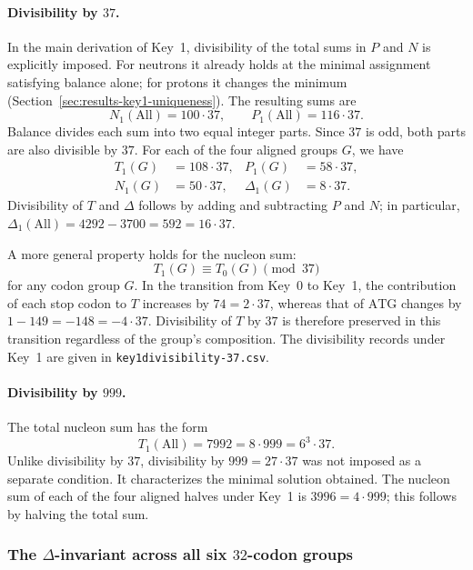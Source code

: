 \documentclass[11pt,a4paper]{article}
\renewcommand{\_}{\origunderscore\allowbreak}
\begin{document}
\paragraph{Divisibility by $37$.}
In the main derivation of Key~1, divisibility of the
total sums in $P$ and $N$ is explicitly imposed. For
neutrons it already holds at the minimal assignment
satisfying balance alone; for protons it changes the
minimum (Section~\ref{sec:results-key1-uniqueness}).
The resulting sums are
\[
N_1(\mathrm{All})=100\cdot37,\qquad
P_1(\mathrm{All})=116\cdot37.
\]
Balance divides each sum into two equal integer parts.
Since $37$ is odd, both parts are also divisible by
$37$. For each of the four aligned groups $G$, we have
\[
\begin{aligned}
T_1(G)&=108\cdot37, & P_1(G)&=58\cdot37,\\
N_1(G)&=50\cdot37, & \Delta_1(G)&=8\cdot37.
\end{aligned}
\]
Divisibility of $T$ and $\Delta$ follows by adding and
subtracting $P$ and $N$; in particular,
$\Delta_1(\mathrm{All})=4292-3700=592=16\cdot37$.

A more general property holds for the nucleon sum:
\[
T_1(G)\equiv T_0(G)\pmod{37}
\]
for any codon group $G$. In the transition from Key~0
to Key~1, the contribution of each stop codon to $T$
increases by $74=2\cdot37$, whereas that of
$\mathrm{ATG}$ changes by $1-149=-148=-4\cdot37$.
Divisibility of $T$ by $37$ is therefore preserved in
this transition regardless of the group's composition.
The divisibility records under Key~1 are given in
\texttt{key1\_divisibility-37.csv}.

\paragraph{Divisibility by $999$.}
The total nucleon sum has the form
\[
T_1(\mathrm{All})=7992=8\cdot999=6^3\cdot37.
\]
Unlike divisibility by $37$, divisibility by
$999=27\cdot37$ was not imposed as a separate condition.
It characterizes the minimal solution obtained.
The nucleon sum of each of the four aligned halves
under Key~1 is $3996=4\cdot999$; this follows by halving
the total sum.

\subsubsection{The \texorpdfstring{$\Delta$}{Delta}-invariant across all six \texorpdfstring{$32$}{32}-codon groups}
\label{sec:results-key1-deltainvariant}
\end{document}
